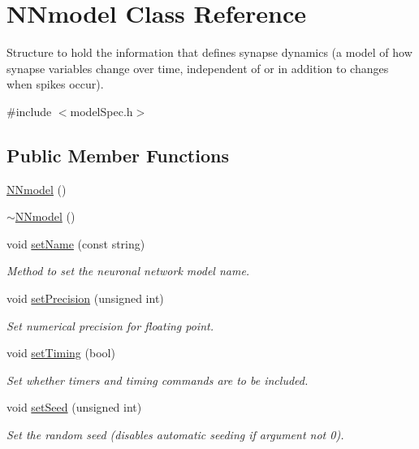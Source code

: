 \hypertarget{classNNmodel}{\section{N\+Nmodel Class Reference}
\label{classNNmodel}
}


Structure to hold the information that defines synapse dynamics (a model of how synapse variables change over time, independent of or in addition to changes when spikes occur).  




{\ttfamily \#include $<$model\+Spec.\+h$>$}

\subsection*{Public Member Functions}
\begin{DoxyCompactItemize}
\item 
\hyperlink{classNNmodel_a91216d74536a5871c507af7f40cd2d64}{N\+Nmodel} ()
\item 
\hyperlink{classNNmodel_aa9f519391df5f08c4ec5f59578ac5ffc}{$\sim$\+N\+Nmodel} ()
\item 
void \hyperlink{classNNmodel_a757eff2a5877688e6e5492726df035ee}{set\+Name} (const string)
\begin{DoxyCompactList}\small\item\em Method to set the neuronal network model name. \end{DoxyCompactList}\item 
void \hyperlink{classNNmodel_a44fb38b93216c56254fbbee6175cffd1}{set\+Precision} (unsigned int)
\begin{DoxyCompactList}\small\item\em Set numerical precision for floating point. \end{DoxyCompactList}\item 
void \hyperlink{classNNmodel_ab843183abd01171e9a8ab99b219cb2b7}{set\+Timing} (bool)
\begin{DoxyCompactList}\small\item\em Set whether timers and timing commands are to be included. \end{DoxyCompactList}\item 
void \hyperlink{classNNmodel_acc6b868fe6383bbea589ba2eddfac679}{set\+Seed} (unsigned int)
\begin{DoxyCompactList}\small\item\em Set the random seed (disables automatic seeding if argument not 0). \end{DoxyCompactList}\item 

\end{DoxyCompactItemize}
